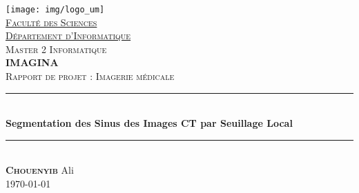 \documentclass[a4paper,12pt,twoside]{report}
\newcommand{\HRule}{\rule{\linewidth}{0.5mm}}
\begin{document}

\begin{titlepage}
 \begin{center}
  
  \texttt{[image: img/logo\_um]} \\[1.5cm]
  \uline{\textsc{Faculté des Sciences}}\\
  \uline{\textsc{Département d'Informatique}}\\[0.7cm]
  
  \textsc{\LARGE Master 2 Informatique \\[0.2cm]\textbf{IMAGINA}}\\[1.0cm]


  \textsc{\Large Rapport de projet : Imagerie médicale}\\[0.5cm]
  
  \HRule \\[0.4cm]
  { \huge \bfseries Segmentation des Sinus des Images CT par Seuillage Local }
  \HRule \\[0.8cm]
  
	
  \textsc{\large{\textbf{Chouenyib}}} Ali\\[0.7cm]
  \noindent
%  
%  
  \vfill
  {\large \today}
 
 \end{center}
\end{titlepage}
\end{document}
